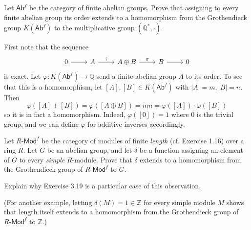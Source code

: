 \documentclass[../../master.tex]{subfiles}
\begin{document}
\begin{problem}
    Let $\mathsf{Ab}^{f}$ be the category of finite abelian groups.
    Prove that assigning to every finite abelian group its order extends to a homomorphism from the Grothendieck group $K(\mathsf{Ab}^{f})$ to the multiplicative group $(\mathbb{Q}^{*}, \cdot)$.
\end{problem}

\begin{solution}
    First note that the sequence
    \[
    \begin{tikzcd}
        0 & A & A \oplus B & B & 0
        \arrow[from=1-1, to=1-2]
        \arrow[from=1-2, to=1-3, "i"]
        \arrow[from=1-3, to=1-4, "\pi"]
        \arrow[from=1-4, to=1-5]
    \end{tikzcd}
    \]
    is exact.
    Let $\varphi : K(\mathsf{Ab}^{f}) \to \mathbb{Q}$ send a finite abelian group $A$ to its order.
    To see that this is a homomorphism, let $[A], [B] \in K(\mathsf{Ab}^{f})$ with $|A| = m, |B| = n$.
    Then
    \[
        \varphi([A] + [B]) = \varphi([A \oplus B]) = mn = \varphi([A]) \cdot \varphi([B])
    \]
    so it is in fact a homomorphism.
    Indeed, $\varphi([0]) = 1$ where $0$ is the trivial group, and we can define $\varphi$ for additive inverses accordingly.
\end{solution}

\begin{problem}
    Let $R\text{-}\mathsf{Mod}^{f}$ be the category of modules of finite \textit{length} (cf. Exercise 1.16) over a ring $R$.
    Let $G$ be an abelian group, and let $\delta$ be a function assigning an element of $G$ to every \textit{simple} $R$-module.
    Prove that $\delta$ extends to a homomorphism from the Grothendieck group of $R\text{-}\mathsf{Mod}^{f}$ to $G$.

    Explain why Exercise 3.19 is a particular case of this observation.

    (For another example, letting $\delta(M) = 1 \in \mathbb{Z}$ for every simple module $M$ shows that length itself extends to a homomorphism from the Grothendieck group of $R\text{-}\mathsf{Mod}^{f}$ to $\mathbb{Z}$.)
\end{problem}
\end{document}
